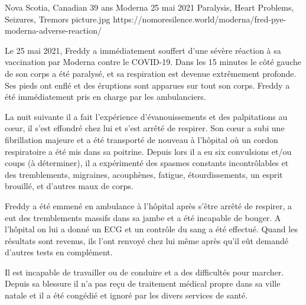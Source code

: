           {Nova Scotia, Canadian}
          {39 ans}
          {Moderna}
          {25 mai 2021}
          {
            Paralysis,
            Heart Problems,
            Seizures,
            Tremors
          }
          {picture.jpg}
          {https://nomoresilence.world/moderna/fred-pye-moderna-adverse-reaction/}
          {

Le 25 mai 2021, Freddy a immédiatement souffert d’une sévère réaction à sa
vaccination par Moderna contre le COVID-19. Dans les 15 minutes le côté gauche
de son corps a été paralysé, et sa respiration est devenue extrêmement
profonde. Ses pieds ont enflé et des éruptions sont apparues sur tout son
corps. Freddy a été immédiatement pris en charge par les ambulanciers.

La nuit suivante il a fait l’expérience d’évanouissements et des palpitations au
cœur, il s’est effondré chez lui et s’est arrêté de respirer. Son cœur a subi
une fibrillation majeure et a été transporté de nouveau à l’hôpital où un cordon
respiratoire a été mis dans sa poitrine. Depuis lors il a eu six convulsions
et/ou coups (à déterminer), il a expérimenté des spasmes constants
incontrôlables et des tremblements, migraines, acouphènes, fatigue,
étourdissements, un esprit brouillé, et d’autres maux de corps.

Freddy a été emmené en ambulance à l’hôpital après s’être arrêté de respirer, a
eut des tremblements massifs dans sa jambe et a été incapable de bouger. A
l’hôpital on lui a donné un ECG et un contrôle du sang a été effectué. Quand les
résultats sont revenus, ils l’ont renvoyé chez lui même après qu’il eût demandé
d’autres tests en complément.

Il est incapable de travailler ou de conduire et a des difficultés pour
marcher. Depuis sa blessure il n’a pas reçu de traitement médical propre dans sa
ville natale et il a été congédié et ignoré par les divers services de santé.

}

